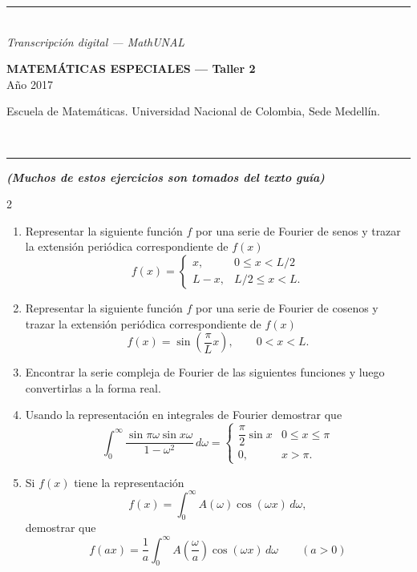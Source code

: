 \documentclass[11pt]{article}
\newcommand{\examheader}[2]{%
  \noindent
  \begin{minipage}[t]{0.6\linewidth}
    {\small\bfseries MATEM\'ATICAS ESPECIALES --- #1}\\
    {\small #2}
  \end{minipage}%
  \hfill
  \begin{minipage}[t]{0.35\linewidth}
    \raggedleft\small Escuela de Matem\'aticas. Universidad Nacional de Colombia, Sede Medell\'in.
  \end{minipage}\\[2pt]
  \rule{\linewidth}{0.6pt}
}
\newcommand{\examfooter}{%
  \vfill
  \rule{\linewidth}{0.4pt}\\[1pt]
  {\scriptsize\textit{Transcripci\'on digital --- MathUNAL}\hfill\textcolor{unalblue}{\textbf{\thepage}}}
}
\begin{document}
\examfooter
\newpage

\examheader{Taller 2}{A\~no 2017}

{\small\itshape\bfseries (Muchos de estos ejercicios son tomados del texto guía)}

\columnseprule=0.5pt
\begin{multicols}{2}
\begin{enumerate}
\item Representar la siguiente función $f$ por una serie de Fourier de senos y trazar la extensión periódica correspondiente de $f(x)$
\[
f(x) = \begin{cases} x, & 0 \le x < L/2 \\ L-x, & L/2 \le x < L. \end{cases}
\]

\item Representar la siguiente función $f$ por una serie de Fourier de cosenos y trazar la extensión periódica correspondiente de $f(x)$
\[
f(x) = \sin\left(\frac{\pi}{L}x\right), \qquad 0 < x < L.
\]

\item Encontrar la serie compleja de Fourier de las siguientes funciones y luego convertirlas a la forma real.

\item Usando la representación en integrales de Fourier demostrar que
\[
\int_0^\infty \frac{\sin \pi\omega \sin x\omega}{1-\omega^2}\,d\omega = \begin{cases} \dfrac{\pi}{2}\sin x & 0 \le x \le \pi \\ 0, & x > \pi. \end{cases}
\]

\item Si $f(x)$ tiene la representación
\[
f(x) = \int_0^\infty A(\omega)\cos(\omega x)\,d\omega,
\]
demostrar que
\[
f(ax) = \frac{1}{a}\int_0^\infty A\left(\frac{\omega}{a}\right)\cos(\omega x)\,d\omega \qquad (a>0)
\]
\end{enumerate}
\end{multicols}
\end{document}
